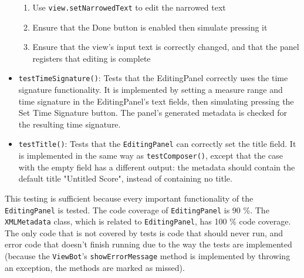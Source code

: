 \documentclass[11pt]{article}
\begin{document}
\begin{itemize}
\begin{enumerate}
\item Use \texttt{view.setNarrowedText} to edit the narrowed text
\item Ensure that the Done button is enabled then simulate pressing it
\item Ensure that the view's input text is correctly changed, and that the panel registers that editing is complete
\end{enumerate}
\item \texttt{testTimeSignature()}: Tests that the EditingPanel correctly uses the time signature functionality.  It is implemented by setting a measure range and time signature in the EditingPanel's text fields, then simulating pressing the Set Time Signature button.  The panel's generated metadata is checked for the resulting time signature.
\item \texttt{testTitle()}: Tests that the \texttt{EditingPanel} can correctly set the title field.  It is implemented in the same way as \texttt{testComposer()}, except that the case with the empty field has a different output: the metadata should contain the default title "Untitled Score", instead of containing no title.
\end{itemize}

This testing is sufficient because every important functionality of the \texttt{EditingPanel} is tested.  The code coverage of \texttt{EditingPanel} is 90 \%.  The \texttt{XMLMetadata} class, which is related to \texttt{EditingPanel}, has 100 \% code coverage.  The only code that is not covered by tests is code that should never run, and error code that doesn't finish running due to the way the tests are implemented (because the \texttt{ViewBot}'s \texttt{showErrorMessage} method is implemented by throwing an exception, the methods are marked as missed).
\end{document}
